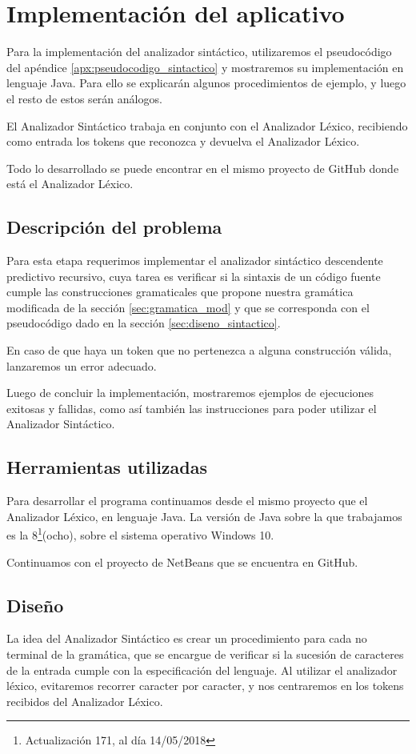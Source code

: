\section{Implementación del aplicativo}
Para la implementación del analizador sintáctico, utilizaremos el pseudocódigo del apéndice \ref{apx:pseudocodigo_sintactico} y mostraremos su implementación en lenguaje Java. Para ello se explicarán algunos procedimientos de ejemplo, y luego el resto de estos serán análogos.

El Analizador Sintáctico trabaja en conjunto con el Analizador Léxico, recibiendo como entrada los tokens que reconozca y devuelva el Analizador Léxico.

Todo lo desarrollado se puede encontrar en el mismo proyecto de GitHub donde está el Analizador Léxico.

\subsection{Descripción del problema}
Para esta etapa requerimos implementar el analizador sintáctico descendente predictivo recursivo, cuya tarea es verificar si la sintaxis de un código fuente cumple las construcciones gramaticales que propone nuestra gramática modificada de la sección \ref{sec:gramatica_mod} y que se corresponda con el pseudocódigo dado en la sección \ref{sec:diseno_sintactico}. 

En caso de que haya un token que no pertenezca a alguna construcción válida, lanzaremos un error adecuado.

Luego de concluir la implementación, mostraremos ejemplos de ejecuciones exitosas y fallidas, como así también las instrucciones para poder utilizar el Analizador Sintáctico.

\subsection{Herramientas utilizadas}
Para desarrollar el programa continuamos desde el mismo proyecto que el Analizador Léxico, en lenguaje Java. La versión de Java sobre la que trabajamos es la 8\footnote{Actualización 171, al día 14/05/2018}(ocho), sobre el sistema operativo Windows 10. 

Continuamos con el proyecto de NetBeans que se encuentra en GitHub.

\subsection{Diseño}
La idea del Analizador Sintáctico es crear un procedimiento para cada no terminal de la gramática, que se encargue de verificar si la sucesión de caracteres de la entrada cumple con la especificación del lenguaje. Al utilizar el analizador léxico, evitaremos recorrer caracter por caracter, y nos centraremos en los tokens recibidos del Analizador Léxico. 

